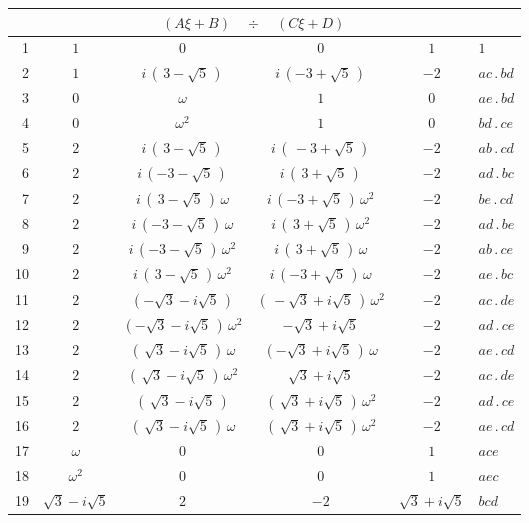 \documentclass[11pt]{article}
\begin{document}
\smallskip
\begin{center}
\footnotesize
\begin{longtable}{r|cccc|l}
\multicolumn{1}{c}{} & \multicolumn{4}{c}{$(A\xi + B)\quad\div\quad(C\xi + D)$} & \\
\hline
\endhead
1  & $1$ & $0$ & $0$ & $1$ & $1$\\
2  & $1$ & $i\,(\,3 - \sqrt{5}\,)$ & $i\,(-3 + \sqrt{5}\,)$ & $-2$ & $ac\,.\,bd$\\
3  & $0$ & $\omega$ & $1$ & $0$ & $ae\,.\,bd$\\
4  & $0$ & $\omega^{2}$ & $1$ & $0$ & $bd\,.\,ce$\\
5  & $2$ & $i\,(\,3 - \sqrt{5}\,)$ & $i\,(\,-3 + \sqrt{5}\,)$ & $-2$ & $ab\,.\,cd$\\
6  & $2$ & $i\,(-3 - \sqrt{5}\,)$ & $i\,(\,3 + \sqrt{5}\,)$ & $-2$ & $ad\,.\,bc$\\
7  & $2$ & $i\,(\,3 - \sqrt{5}\,)\,\omega$ & $i\,(-3 + \sqrt{5}\,)\,\omega^{2}$ & $-2$ & $be\,.\,cd$\\
8  & $2$ & $i\,(-3 - \sqrt{5}\,)\,\omega$ & $i\,(\,3 + \sqrt{5}\,)\,\omega^{2}$ & $-2$ & $ad\,.\,be$\\
9  & $2$ & $i\,(-3 - \sqrt{5}\,)\,\omega^{2}$ & $i\,(\,3 + \sqrt{5}\,)\,\omega$ & $-2$ & $ab\,.\,ce$\\
10 & $2$ & $i\,(\,3 - \sqrt{5}\,)\,\omega^{2}$ & $i\,(-3 + \sqrt{5}\,)\,\omega$ & $-2$ & $ae\,.\,bc$\\
11 & $2$ & $(-\sqrt{3} - i\sqrt{5}\,)$ & $(\,-\sqrt{3} + i\sqrt{5}\,)\,\omega^{2}$ & $-2$ & $ac\,.\,de$\\
12 & $2$ & $(-\sqrt{3} - i\sqrt{5}\,)\,\omega^{2}$ & $-\sqrt{3} + i\sqrt{5}$ & $-2$ & $ad\,.\,ce$\\
13 & $2$ & $(\,\sqrt{3} - i\sqrt{5}\,)\,\omega$ & $(-\sqrt{3} + i\sqrt{5}\,)\,\omega$ & $-2$ & $ae\,.\,cd$\\
14 & $2$ & $(\,\sqrt{3} - i\sqrt{5}\,)\,\omega^{2}$ & $\sqrt{3} + i\sqrt{5}$ & $-2$ & $ac\,.\,de$\\
15 & $2$ & $(\,\sqrt{3} - i\sqrt{5}\,)$ & $(\,\sqrt{3} + i\sqrt{5}\,)\,\omega^{2}$ & $-2$ & $ad\,.\,ce$\\
16 & $2$ & $(\,\sqrt{3} - i\sqrt{5}\,)\,\omega$ & $(\,\sqrt{3} + i\sqrt{5}\,)\,\omega^{2}$ & $-2$ & $ae\,.\,cd$\\
17 & $\omega$ & $0$ & $0$ & $1$ & $ace$\\
18 & $\omega^{2}$ & $0$ & $0$ & $1$ & $aec$\\
19 & $\sqrt{3} - i\sqrt{5}$ & $2$ & $-2$ & $\sqrt{3} + i\sqrt{5}$ & $bcd$\\

\end{longtable}
\end{center}
\end{document}
